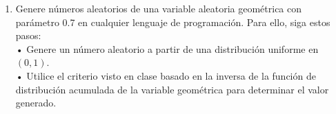 \documentclass[a4paper, 12pt]{article}
\newcommand{\Pspace}{0.5cm}
\newcommand{\Aspace}{0.2cm}
\begin{document}
\begin{enumerate}
    \vspace{\Pspace}
    \item Genere números aleatorios de una variable aleatoria geométrica con parámetro 0.7 en cualquier lenguaje de programación. Para ello, siga estos pasos:
    \vspace{0.2cm}
    \\ • Genere un número aleatorio a partir de una distribución uniforme en $(0, 1)$.
    \\ • Utilice el criterio visto en clase basado en la inversa de la función de distribución acumulada de la variable geométrica para determinar el valor generado.
    \vspace{\Aspace} \par
    { \color{azul}  }
\end{enumerate}
\end{document}
